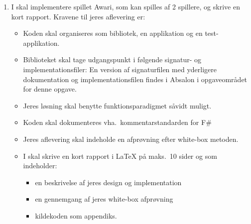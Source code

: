 \begin{enumerate}
\item I skal implementere spillet Awari, som kan spilles af 2
  spillere, og skrive en kort rapport. Kravene til jeres aflevering
  er:
  \begin{itemize}
  \item Koden skal organiseres som bibliotek, en applikation og en
    test-applikation.
  \item Biblioteket skal tage udgangspunkt i følgende signatur- og
    implementationsfiler:
     En version af signaturfilen
    med yderligere dokumentation og implementationsfilen findes i
    Absalon i opgaveområdet for denne opgave.
  \item Jeres løsning skal benytte funktionsparadigmet såvidt muligt.
  \item Koden skal dokumenteres vha.\ kommentarstandarden for F\#
  \item Jeres aflevering skal indeholde en afprøvning efter white-box metoden.
  \item I skal skrive en kort rapport i LaTeX  på maks.\ 10 sider og
    som indeholder:
    \begin{itemize}
    \item en beskrivelse af jeres design og implementation
    \item en gennemgang af jeres white-box afprøvning
    \item kildekoden som appendiks.
    \end{itemize}
  \end{itemize}
\end{enumerate}

